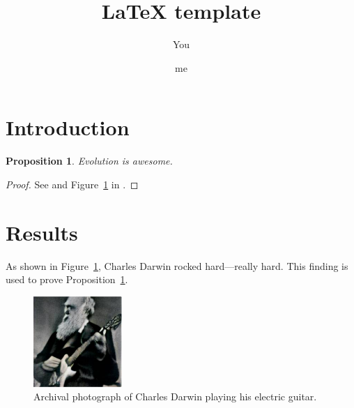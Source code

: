 \documentclass{article}
\title{\LaTeX{} template}
\author{You \and me}
\newtheorem{prop}{Proposition}
\begin{document}
\maketitle

\section*{Introduction}\label{sec:intro}

\begin{prop}\label{prop:evo}
Evolution is awesome.
\end{prop}
\begin{proof}
  See \cite{darwin1909origin} and Figure~\ref{fig:darwin} in .
\end{proof}

\section*{Results}\label{sec:results}

As shown in Figure~\ref{fig:darwin}, Charles Darwin rocked hard---really hard.
This finding is used to prove Proposition~\ref{prop:evo}.

\begin{figure}[h]
 \centering
 \includegraphics[width=0.3\textwidth]{figures/darwin-rock}
 \caption{Archival photograph of Charles Darwin playing his electric guitar.}
 \label{fig:darwin}
\end{figure}




\end{document}
